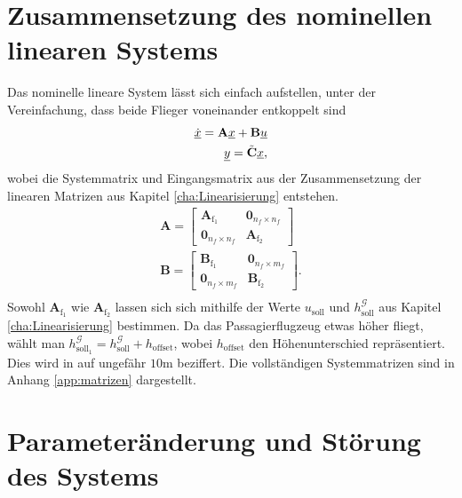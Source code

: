 \section{Zusammensetzung des nominellen linearen Systems}
Das nominelle lineare System lässt sich einfach aufstellen, unter der Vereinfachung, dass beide Flieger voneinander entkoppelt sind
\begin{align}
\underline{\dot{x}} = \textbf{A}\underline{x} + \textbf{B}\underline{u}\\
\underline{y} = \Tilde{\textbf{C}}\underline{x},
\end{align}
wobei die Systemmatrix und Eingangsmatrix aus der Zusammensetzung der linearen Matrizen aus Kapitel \ref{cha:Linearisierung} entstehen.
\begin{align}
\textbf{A} = \begin{bmatrix} 
\textbf{A}_\mathrm{f_1}& \textbf{0}_{n_f\times n_f}\\
\textbf{0}_{n_f\times n_f} & \textbf{A}_\mathrm{f_2}
\end{bmatrix}\\
\textbf{B} = \begin{bmatrix} 
\textbf{B}_\mathrm{f_1}& \textbf{0}_{n_f\times m_f}\\
\textbf{0}_{n_f\times m_f} & \textbf{B}_\mathrm{f_2}
\end{bmatrix}.\\
\end{align}
Sowohl $\textbf{A}_\mathrm{f_1}$ wie $\textbf{A}_\mathrm{f_2}$ lassen sich sich mithilfe der Werte $u_\mathrm{soll}$ und $h^\mathcal{G}_\mathrm{soll}$ aus Kapitel \ref{cha:Linearisierung} bestimmen. Da das Passagierflugzeug etwas höher fliegt, wählt man $h^\mathcal{G}_\mathrm{soll_1} = h^\mathcal{G}_\mathrm{soll} + h_\mathrm{offset}$, wobei $h_\mathrm{offset}$ den Höhenunterschied repräsentiert. Dies wird in  \cite{LengthBoom} auf ungefähr $10 \mathrm{m}$ beziffert. Die vollständigen Systemmatrizen sind in Anhang \ref{app:matrizen} dargestellt.
\section{Parameteränderung und Störung des Systems}
